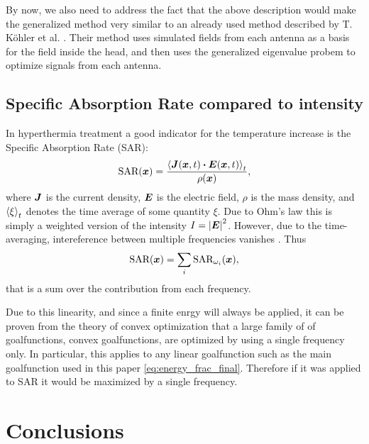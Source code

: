 \documentclass[11pt,a4paper, 
swedish,english %
]{article}
\begin{document}
By now, we also need to address the fact that the above description 
would make the generalized method very similar to an already used
method described by T. Köhler et al. \cite{Kohler2001}. Their method
uses simulated fields from each antenna as a basis for the field inside
the head, and then uses the generalized eigenvalue probem to optimize 
signals from each antenna. 


\subsection{Specific Absorption Rate compared to intensity}
\label{sec:SAR}
In hyperthermia treatment a good indicator for the temperature
increase is the Specific Absorption Rate (SAR): 
\begin{equation}
\text{SAR}(\vb*x)=
\frac{\ev{\vb*J(\vb*x,t)\vdot \vb*E(\vb*x,t)}_t}{\rho(\vb*x)},
\end{equation}
where $\vb*J$ is the current density, $\vb*E$ is the
electric field, $\rho$ is the mass density, and $\ev{\xi}_t$ denotes
the time average of some quantity $\xi$.
Due to Ohm's law this is simply a weighted version of the intensity
$I=\abs{\vb*E}^2$.
However, due to the time-averaging, intereference between multiple
frequencies vanishes \cite{Martinsson}. Thus
\begin{equation}
\text{SAR}(\vb*x)=\sum_i\text{SAR}_{\omega_i}(\vb*x),
\end{equation}
that is a sum over the contribution from each frequency.

Due to this linearity, and since a finite enrgy will always be applied, it can be proven from the theory of convex optimization 
that a large family of of goalfunctions, convex goalfunctions, are optimized by using a single frequency only. 
In particular, this applies to any linear goalfunction such as the main goalfunction used in this paper
\eqref{eq:energy_frac_final}. Therefore if it was applied to SAR it would be maximized by a single frequency.  




\section{Conclusions}






\end{document}

